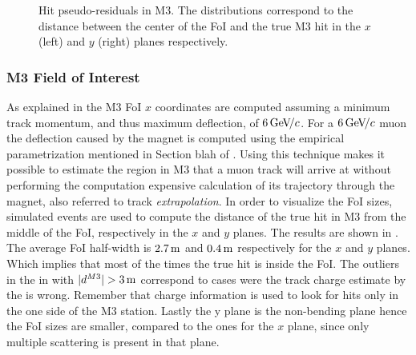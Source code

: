 \begin{figure}[t]
  \centering
  \begin{subfigure}{0.5\textwidth}
    \raggedright
    \scalebox{.6}{}
    \caption{}
    \label{mvTTm_res_x}
  \end{subfigure}%
  \hfill%
  \begin{subfigure}{0.5\textwidth}
    \raggedleft
    \scalebox{.6}{}
    \caption{}
    \label{mvm_res_y}
  \end{subfigure}
  \caption{Hit pseudo-residuals in M3. The distributions correspond to the distance between the center of the FoI and the true M3 hit
           in the $x$ (left) and $y$ (right) planes respectively.}
 \label{mvm_res}
\end{figure}

\subsubsection{M3 Field of Interest}
As explained in  the M3 FoI $x$ coordinates are computed assuming a minimum track momentum, and thus maximum deflection,
of $6{\mathrm{\,Ge\kern -0.1em V\!/}c}$. For a $6{\mathrm{\,Ge\kern -0.1em V\!/}c}$ muon the deflection caused by the \lhcb magnet is computed using the empirical parametrization mentioned in Section blah of \cite{roelThesis}.
Using this technique makes it possible to estimate the region in M3 that a muon track will arrive at without performing the computation
expensive calculation of its trajectory through the \lhcb magnet, also referred to track {\it extrapolation}. In order to visualize the FoI sizes,
simulated events are used to compute the distance of the true hit in M3 from the middle of the FoI, respectively in the $x$ and $y$ planes.
The results are shown in . The average FoI half-width is $2.7\rm \,m$ and $0.4\rm \,m$ respectively for the $x$ and $y$ planes.
Which implies that most of the times the true hit is inside the FoI. The outliers in the  in with $|d^{M3}|>3\m$
correspond to cases were the track charge estimate by the \ttracker is wrong. Remember that charge information is used to
look for hits only in the one side of the M3 station. Lastly the y plane is the non-bending plane hence the FoI sizes
are smaller, compared to the ones for the $x$ plane, since only multiple scattering is present in that plane.

